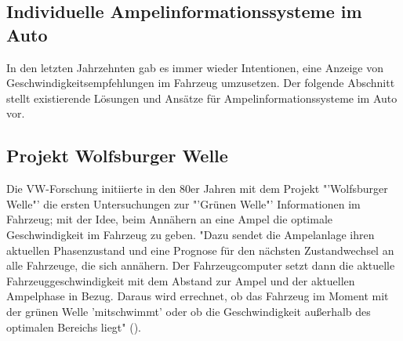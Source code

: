 \subsection{Individuelle Ampelinformationssysteme im Auto}
In den letzten Jahrzehnten gab es immer wieder Intentionen, eine Anzeige von Geschwindigkeitsempfehlungen im Fahrzeug umzusetzen. Der folgende Abschnitt stellt existierende Lösungen und Ansätze für Ampelinformationssysteme im Auto vor.
\subsection*{Projekt Wolfsburger Welle}
Die VW-Forschung initiierte in den 80er Jahren mit dem Projekt "'Wolfsburger Welle"' die ersten Untersuchungen zur "'Grünen Welle"' Informationen im Fahrzeug; mit der Idee, beim Annähern an eine Ampel die optimale Geschwindigkeit im Fahrzeug zu geben.\cite{Welle} "Dazu sendet die Ampelanlage ihren aktuellen Phasenzustand und eine Prognose für den nächsten Zustandwechsel an alle Fahrzeuge, die sich annähern. Der Fahrzeugcomputer setzt dann die aktuelle Fahrzeuggeschwindigkeit mit dem Abstand zur Ampel und der aktuellen Ampelphase in Bezug. Daraus wird errechnet, ob das Fahrzeug im Moment mit der grünen Welle ’mitschwimmt’ oder ob die Geschwindigkeit außerhalb des optimalen Bereichs liegt" (\cite{MenschMaschine}).
